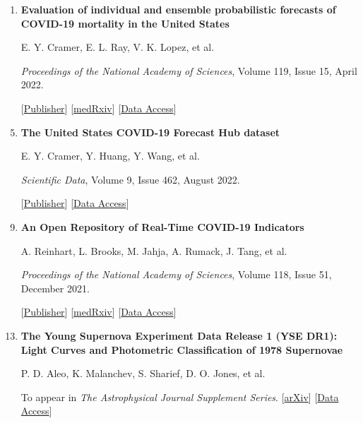 \documentclass[letterpaper,10pt]{article}
\begin{document}
\begin{enumerate}[leftmargin=0.6cm, itemsep=-0.05cm]
\vspace{0.5cm}

\item {\bf Evaluation of individual and ensemble probabilistic forecasts of COVID-19 mortality in the United States} 
\item[] E. Y. Cramer, E. L. Ray, V. K. Lopez, et al.
\item[] {\it Proceedings of the National Academy of Sciences}, Volume 119, Issue 15, April 2022.
\item[] [\href{https://www.pnas.org/doi/10.1073/pnas.2113561119}{Publisher}] [\href{https://www.medrxiv.org/content/10.1101/2021.02.03.21250974v3}{medRxiv}] [\href{https://covid19forecasthub.org/}{Data Access}]

\vspace{0.5cm}

\item {\bf The United States COVID-19 Forecast Hub dataset} 
\item[] E. Y. Cramer, Y. Huang, Y. Wang, et al.
\item[] {\it Scientific Data}, Volume 9, Issue 462, August 2022.
\item[] [\href{https://doi.org/10.1038/s41597-022-01517-w}{Publisher}] [\href{https://covid19forecasthub.org/}{Data Access}]

\vspace{0.5cm}

\item {\bf An Open Repository of Real-Time COVID-19 Indicators} 
\item[] A. Reinhart, L. Brooks, M. Jahja, A. Rumack, J. Tang, et al.
\item[] {\it Proceedings of the National Academy of Sciences}, Volume 118, Issue 51, December 2021.
\item[] [\href{https://doi.org/10.1073/pnas.2111452118}{Publisher}]
[\href{https://www.medrxiv.org/content/10.1101/2021.07.12.21259660v2}{medRxiv}]
[\href{https://cmu-delphi.github.io/delphi-epidata/api/covidcast.html}{Data Access}]

\vspace{0.5cm}

\item {\bf The Young Supernova Experiment Data Release 1 (YSE DR1): Light Curves and Photometric Classification of 1978 Supernovae}
\item[] P. D. Aleo, K. Malanchev, S. Sharief, D. O. Jones, et al.
\item[] To appear in {\it The Astrophysical Journal Supplement Series}. [\href{https://arxiv.org/abs/2211.07128}{arXiv}] [\href{https://zenodo.org/record/7317476#.Y_8-n-zP1DY}{Data Access}]


\end{enumerate}
\end{document}
